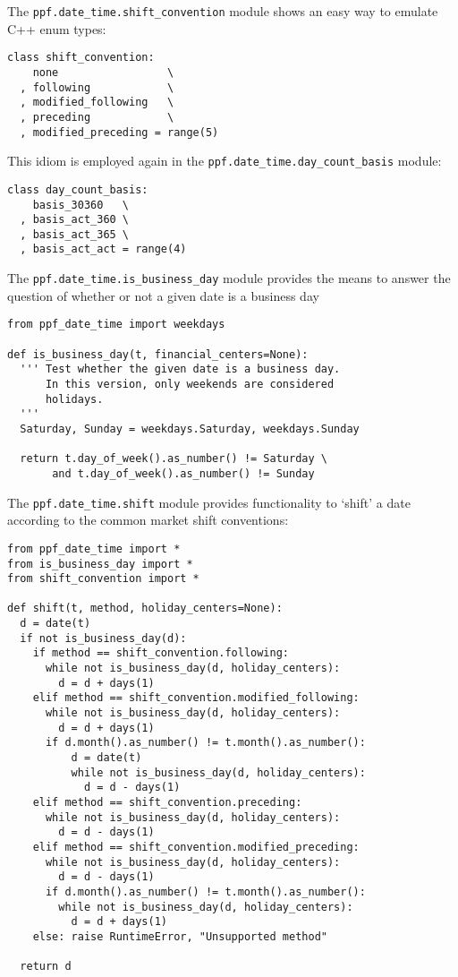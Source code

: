 The \verb|ppf.date_time.shift_convention| module shows an easy way to
emulate C++ enum types:
\begin{verbatim}
class shift_convention:
    none                 \
  , following            \
  , modified_following   \
  , preceding            \
  , modified_preceding = range(5)
\end{verbatim}
This idiom is employed again in the
\verb|ppf.date_time.day_count_basis| module:
\begin{verbatim}
class day_count_basis:
    basis_30360   \
  , basis_act_360 \
  , basis_act_365 \
  , basis_act_act = range(4)
\end{verbatim}
The \verb|ppf.date_time.is_business_day| module provides the means to
answer the question of whether or not a given date is a business day
\begin{verbatim}
from ppf_date_time import weekdays

def is_business_day(t, financial_centers=None):
  ''' Test whether the given date is a business day.
      In this version, only weekends are considered
      holidays.
  '''
  Saturday, Sunday = weekdays.Saturday, weekdays.Sunday

  return t.day_of_week().as_number() != Saturday \
       and t.day_of_week().as_number() != Sunday

\end{verbatim}
The \verb|ppf.date_time.shift| module provides functionality to
`shift' a date according to the common market shift conventions:
\begin{verbatim}
from ppf_date_time import *
from is_business_day import *
from shift_convention import *

def shift(t, method, holiday_centers=None):
  d = date(t)
  if not is_business_day(d):
    if method == shift_convention.following:
      while not is_business_day(d, holiday_centers):
        d = d + days(1)
    elif method == shift_convention.modified_following:
      while not is_business_day(d, holiday_centers):
        d = d + days(1)
      if d.month().as_number() != t.month().as_number():
          d = date(t)
          while not is_business_day(d, holiday_centers):
            d = d - days(1)
    elif method == shift_convention.preceding:
      while not is_business_day(d, holiday_centers):
        d = d - days(1)
    elif method == shift_convention.modified_preceding:
      while not is_business_day(d, holiday_centers):
        d = d - days(1)
      if d.month().as_number() != t.month().as_number():
        while not is_business_day(d, holiday_centers):
          d = d + days(1)
    else: raise RuntimeError, "Unsupported method"

  return d
\end{verbatim}
